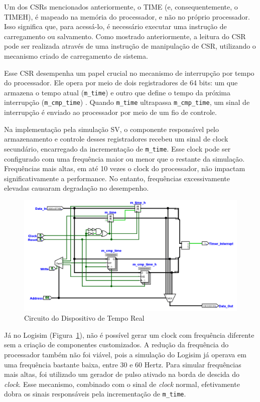 \documentclass[
	12pt,				%
	openright,			%
	oneside,			%
	a4paper,			%
	english,			%
	french,				%
	spanish,			%
	brazil,				%
	]{abntex2}
\begin{document}
Um dos CSRs mencionados anteriormente, o TIME (e, consequentemente, o TIMEH), é mapeado na memória do processador, e não no próprio processador. Isso significa que, para acessá-lo, é necessário executar uma instrução de carregamento ou salvamento. Como mostrado anteriormente, a leitura do CSR pode ser realizada através de uma instrução de manipulação de CSR, utilizando o mecanismo criado de carregamento de sistema.

Esse CSR desempenha um papel crucial no mecanismo de interrupção por tempo do processador. Ele opera por meio de dois registradores de 64 bits: um que armazena o tempo atual (\texttt{m\_time}) e outro que define o tempo da próxima interrupção (\texttt{m\_cmp\_time}) \cite[p.5]{risc-v_risc-v_2022}. Quando \texttt{m\_time} ultrapassa \texttt{m\_cmp\_time}, um sinal de interrupção é enviado ao processador por meio de um fio de controle.

Na implementação pela simulação SV, o componente responsável pelo armazenamento e controle desses registradores recebeu um sinal de clock secundário, encarregado da incrementação de \texttt{m\_time}. Esse clock pode ser configurado com uma frequência maior ou menor que o restante da simulação. Frequências mais altas, em até 10 vezes o clock do processador, não impactam significativamente a performance. No entanto, frequências excessivamente elevadas causaram degradação no desempenho.

\begin{figure}[h]
    \centering
    \includegraphics[width=0.75\linewidth]{ProcessoDesenvolvimento/Arquitetura/RealTimeDevice.png}
    \caption{Circuito do Dispositivo de Tempo Real}
    \label{fig:RTD_Circuit}
\end{figure}

Já no Logisim (Figura~\ref{fig:RTD_Circuit}), não é possível gerar um clock com frequência diferente sem a criação de componentes customizados. A redução da frequência do processador também não foi viável, pois a simulação do Logisim já operava em uma frequência bastante baixa, entre 30 e 60 Hertz. Para simular frequências mais altas, foi utilizado um gerador de pulso ativado na borda de descida do \textit{clock}. Esse mecanismo, combinado com o sinal de \textit{clock} normal, efetivamente dobra os sinais responsáveis pela incrementação de \texttt{m\_time}.
\end{document}

